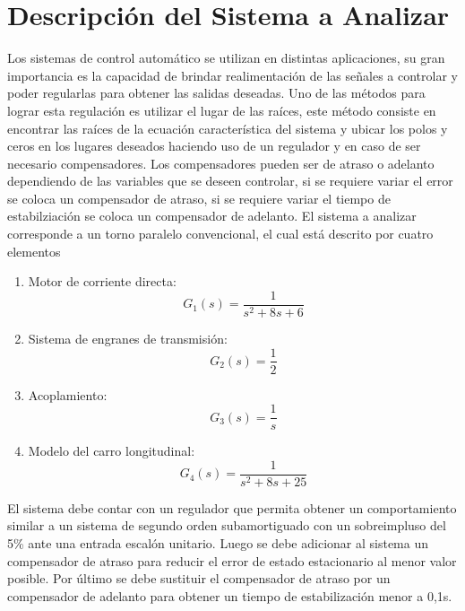 \documentclass[12pt,letterpaper]{article}
\begin{document}
\section{Descripción del Sistema a Analizar} 
Los sistemas de control automático se utilizan en distintas aplicaciones, su gran importancia es la capacidad de brindar realimentación de las señales a controlar y poder regularlas para obtener las salidas deseadas.  
Uno de las métodos para lograr esta regulación es utilizar el lugar de las raíces, este método consiste en encontrar las raíces de la ecuación característica del sistema y ubicar los polos y ceros en los lugares deseados haciendo uso de un regulador y en caso de ser necesario compensadores. 
Los compensadores pueden ser de atraso o adelanto dependiendo de las variables que se deseen controlar, si se requiere variar el error se coloca un compensador de atraso, si se requiere variar el tiempo de estabilziación se coloca un compensador de adelanto.
 El sistema a analizar corresponde a un torno paralelo convencional, el cual está descrito por cuatro elementos
\begin{enumerate}
    \item Motor de corriente directa: \\ 
    \begin{equation}
    G_{1}(s) = \frac{1}{s^{2}+8s+6}
    \end{equation}
    \item  Sistema de engranes de transmisión:\\ 
    \begin{equation}
    G_{2}(s) = \frac{1}{2}
    \end{equation}
    \item  Acoplamiento: 
    \begin{equation}
    G_{3}(s) = \frac{1}{s}
    \end{equation}
    \item Modelo del carro longitudinal: \\
    \begin{equation}
    G_{4}(s) = \frac{1}{s^{2}+8s+25}
    \end{equation}
\end{enumerate}
 El sistema debe contar con un regulador que permita obtener un comportamiento similar a un sistema de segundo orden subamortiguado con un sobreimpluso del 5\% ante una entrada escalón unitario. Luego se debe adicionar al sistema un compensador de atraso para reducir el error de estado estacionario al menor valor posible. 
 Por último se debe sustituir el compensador de atraso por un compensador de adelanto para obtener un tiempo de estabilización menor a 0,1s. 
\end{document}
